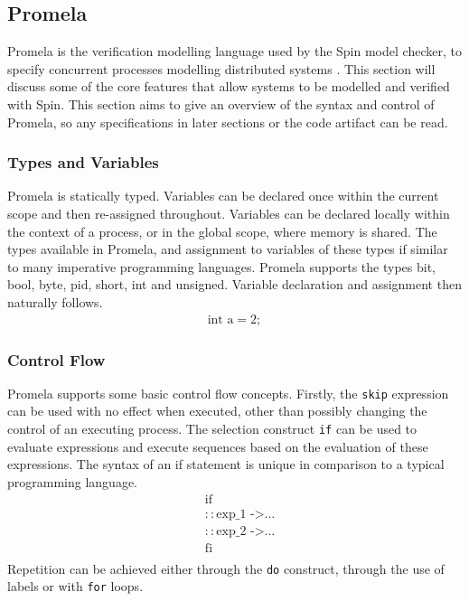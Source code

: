 \subsection{Promela} \label{sec:promela}
Promela is the verification modelling language used by the Spin model checker, to specify concurrent processes modelling distributed systems \cite{spin}. This section will discuss some of the core features that allow systems to be modelled and verified with Spin. This section aims to give an overview of the syntax and control of Promela, so any specifications in later sections or the code artifact can be read.
\subsubsection[]{Types and Variables}
Promela is statically typed. Variables can be declared once within the current scope and then re-assigned throughout. Variables can be declared locally within the context of a process, or in the global scope, where memory is shared. The types available in Promela, and assignment to variables of these types if similar to many imperative programming languages. Promela supports the types bit, bool, byte, pid, short, int and unsigned. Variable declaration and assignment then naturally follows.
\[
\begin{aligned}
\text{int a} = 2;
\end{aligned}
\]
\subsubsection[]{Control Flow}
Promela supports some basic control flow concepts. Firstly, the \texttt{skip} expression can be used with no effect when executed, other than possibly changing the control of an executing process. The selection construct \texttt{if} can be used to evaluate expressions and execute sequences based on the evaluation of these expressions. The syntax of an if statement is unique in comparison to a typical programming language.
\[
\begin{aligned}
& \text{if} \\
& :: \text{exp\_1 ->} \dots \\
& :: \text{exp\_2 ->} \dots \\
& \text{fi} \\
\end{aligned}    
\]
Repetition can be achieved either through the \texttt{do} construct, through the use of labels or with \texttt{for} loops.
